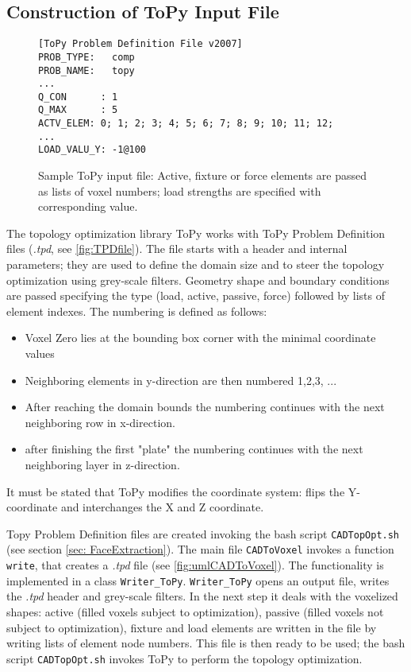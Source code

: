\subsection{Construction of ToPy Input File}
\label{sec: ToPyInputConstruction}
\begin{figure}[b]
\begin{lstlisting}
[ToPy Problem Definition File v2007]
PROB_TYPE:   comp
PROB_NAME:   topy
...
Q_CON      : 1
Q_MAX      : 5
ACTV_ELEM: 0; 1; 2; 3; 4; 5; 6; 7; 8; 9; 10; 11; 12; 
...
LOAD_VALU_Y: -1@100
\end{lstlisting}
\caption{Sample ToPy input file: Active, fixture or force elements are passed as lists of voxel numbers; load strengths are specified with corresponding value.}
\label{fig:TPDfile}
\end{figure}
The topology optimization library ToPy works with ToPy Problem Definition files ({\it.tpd}, see \autoref{fig:TPDfile}). The file starts with a header and internal parameters; they are used to define the domain size and to steer the topology optimization using grey-scale filters. Geometry shape and boundary conditions are passed specifying the type (load, active, passive, force) followed by lists of element indexes. The numbering is defined as follows:\enlargethispage{1cm}
\begin{itemize}
\item Voxel Zero lies at the bounding box corner with the minimal coordinate values
\item Neighboring elements in y-direction are then numbered 1,2,3, ...
\item After reaching the domain bounds the numbering continues with the next neighboring row in x-direction.
\item after finishing the first "plate" the numbering continues with the next neighboring layer in z-direction.
\end{itemize}
It must be stated that ToPy modifies the coordinate system: flips the Y-coordinate and interchanges the X and Z coordinate. 

Topy Problem Definition files are created invoking the bash script \lstinline|CADTopOpt.sh| (see section \ref{sec: FaceExtraction}). The main file \lstinline|CADToVoxel| invokes a function \lstinline|write|, that creates a {\it.tpd} file (see \autoref{fig:umlCADToVoxel}). The functionality is implemented in a class \lstinline|Writer_ToPy|. \lstinline|Writer_ToPy| opens an output file, writes the {\it.tpd} header and grey-scale filters. In the next step it deals with the voxelized shapes: active (filled voxels subject to optimization), passive (filled voxels not subject to optimization), fixture and load elements are written in the file by writing lists of element node numbers. This file is then ready to be used; the bash script \lstinline|CADTopOpt.sh| invokes ToPy to perform the topology optimization.
